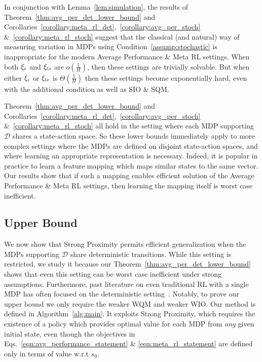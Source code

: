 \documentclass[11pt,twoside]{article}
\begin{document}
\noindent In conjunction with Lemma~\ref{lem:simulation}, the results of Theorem~\ref{thm:avg_per_det_lower_bound} and Corollaries~\ref{corollary:meta_rl_det},~\ref{corollary:avg_per_stoch} \&~\ref{corollary:meta_rl_stoch} suggest that the classical (and natural) way of measuring variation in MDPs using Condition~\ref{assump:stochastic} is inappropriate for the modern Average Performance \& Meta RL settings. When both $\operatorname{\xi_r}$ and $\operatorname{\xi_{tr}}$ are $o(\frac{1}{H})$, then these settings are trivially solvable. But when either $\operatorname{\xi_r}$ or $\operatorname{\xi_{tr}}$ is $\Theta(\frac{1}{H})$ then these settings become exponentially hard, even with the additional \weakprox{} condition as well as SIO \& SQM.

Theorem~\ref{thm:avg_per_det_lower_bound} and Corollaries~\ref{corollary:meta_rl_det},~\ref{corollary:avg_per_stoch} \&~\ref{corollary:meta_rl_stoch} all hold in the setting where each MDP supporting $\mathcal{D}$ shares a state-action space. So these lower bounds immediately apply to more complex settings where the MDPs are defined on disjoint state-action spaces, and where learning an appropriate representation is necessary. Indeed, it is popular in practice to learn a feature mapping which maps similar states to the same vector. Our results show that if such a mapping enables efficient solution of the Average Performance \& Meta RL settings, then learning the mapping itself is worst case inefficient.

\subsection{Upper Bound}
\label{sec:upper_bound}
We now show that Strong Proximity permits efficient generalization when the MDPs supporting $\mathcal{D}$ share deterministic transitions. While this setting is restricted, we study it because our Theorem~\ref{thm:avg_per_det_lower_bound} shows that even this setting can be worst case inefficient under strong assumptions. Furthermore, past literature on even traditional RL with a single MDP has often focused on the deterministic setting~\citep{zheng13detfunc, du20detfunc}. Notably, to prove our upper bound we only require the weaker WQM and weaker WIO. Our method is defined in Algorithm~\ref{alg:main}. It exploits Strong Proximity, which requires the existence of a policy which provides optimal value for each MDP from \emph{any} given initial state, even though the objectives in Eqs.~\eqref{eqn:avg_performance_statement} \& \eqref{eqn:meta_rl_statement} are defined only in terms of value w.r.t $s_0$.
\end{document}
